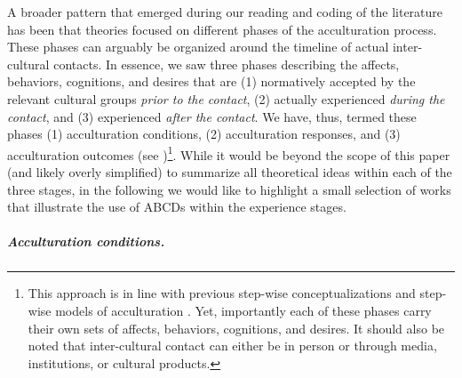 A broader pattern that emerged during our reading and coding of the
literature has been that theories focused on different phases of the
acculturation process. These phases can arguably be organized around the
timeline of actual inter-cultural contacts. In essence, we saw three
phases describing the affects, behaviors, cognitions, and desires that
are (1) normatively accepted by the relevant cultural groups
\textit{prior to the contact}, (2) actually experienced
\textit{during the contact}, and (3) experienced
\textit{after the contact}. We have, thus, termed these phases (1)
acculturation conditions, (2) acculturation responses, and (3)
acculturation outcomes (see
)\footnote{This approach is in line with previous step-wise conceptualizations \citep[e.g., process vs. outcome distinction;][]{Sam2006b} and step-wise models of acculturation \citep[e.g.,][]{Arends-Toth2006a, TeLindert2008a}. Yet, importantly each of these phases carry their own sets of affects, behaviors, cognitions, and desires. It should also be noted that inter-cultural contact can either be in person or through media, institutions, or cultural products.}.
While it would be beyond the scope of this paper (and likely overly
simplified) to summarize all theoretical ideas within each of the three
stages, in the following we would like to highlight a small selection of
works that illustrate the use of ABCDs within the experience stages.

\subparagraph{Acculturation conditions.}

